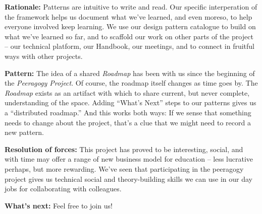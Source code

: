 \textbf{Rationale:}
Patterns are intuitive to write and read.  Our specific interperation of the framework helps us document what we've learned, and even moreso, to help everyone involved keep learning.  We use our design pattern catalogue to build on what we've learned so far, and to scaffold our work on other parts of the project -- our technical platform, our Handbook, our meetings, and to connect in fruitful ways with other projects.  

\textbf{Pattern:}
The idea of a shared \emph{Roadmap} has been with us since the beginning of the \emph{Peeragogy Project}.  Of course, the roadmap itself changes as time goes by.  The \emph{Roadmap} exists as an artifact with which to share current, but never complete,  understanding of the space. Adding “What’s Next” steps to our patterns gives us a “distributed  roadmap.” And this works both ways: If we sense that something needs to  change about the project, that’s a clue that we might need to record a  new pattern.

\textbf{Resolution of forces:}  
This project has proved to be interesting, social, and with time may offer a range of new business model for education -- less lucrative perhaps, but more rewarding.  We've seen that participating in the peeragogy project gives us technical social and theory-building skills we can use in our day jobs for collaborating with colleagues.   

\textbf{What's next:} 
Feel free to join us!